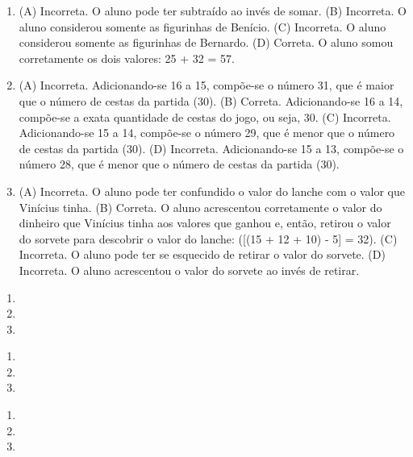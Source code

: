 \begin{enumerate}
\item
(A)  Incorreta. O aluno pode ter subtraído ao invés de somar.
(B)  Incorreta. O aluno considerou somente as figurinhas de Benício.
(C)  Incorreta. O aluno considerou somente as figurinhas de Bernardo.
(D)  Correta. O aluno somou corretamente os dois valores: 25 + 32 = 57.

\item
(A) Incorreta. Adicionando-se 16 a 15, compõe-se o número 31, que é maior que o número de cestas da partida (30).
(B) Correta. Adicionando-se 16 a 14, compõe-se a exata quantidade de cestas do jogo, ou seja, 30.
(C) Incorreta. Adicionando-se 15 a 14, compõe-se o número 29, que é menor que o número de cestas da partida (30).
(D) Incorreta. Adicionando-se 15 a 13, compõe-se o número 28, que é menor que o número de cestas da partida (30).

\item
(A)  Incorreta. O aluno pode ter confundido o valor do lanche com o valor
  que Vinícius tinha.
(B)  Correta. O aluno acrescentou corretamente o valor do dinheiro que Vinícius tinha
  aos valores que ganhou e, então, retirou o valor do sorvete para
  descobrir o valor do lanche: ([(15 + 12 + 10) - 5] = 32).
(C)  Incorreta. O aluno pode ter se esquecido de retirar o valor do sorvete.
(D)  Incorreta. O aluno acrescentou o valor do sorvete ao invés de retirar.
\end{enumerate}


\begin{enumerate}
\item

\item

\item
\end{enumerate}


\begin{enumerate}
\item

\item

\item
\end{enumerate}


\begin{enumerate}
\item

\item

\item
\end{enumerate}

